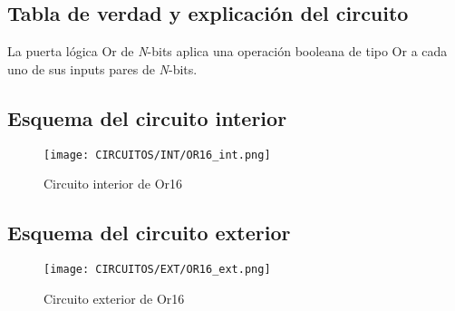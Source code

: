 \documentclass[12pt]{article}
\begin{document}
		\subsection{Tabla de verdad y explicación del circuito}
		La puerta lógica Or de \textit{N}-bits aplica una operación booleana de tipo Or a cada uno de sus inputs pares de \textit{N}-bits. \cite{nisan_nand2tetris_2005}
		\begin{table}[H]
			\centering
			\caption{Tabla de verdad de OR16}
			\label{tab:tab_or16}
		\end{table}

		\subsection{Esquema del circuito interior}
		\begin{figure}[H]
			\centering
			\texttt{[image: CIRCUITOS/INT/OR16\_int.png]}
			\caption{Circuito interior de Or16 \cite{circuitverse}}
			\label{fig:or16_int}
		\end{figure}
		\subsection{Esquema del circuito exterior}
		\begin{figure}[H]
			\centering
			\texttt{[image: CIRCUITOS/EXT/OR16\_ext.png]}
			\caption{Circuito exterior de Or16 \cite{circuitverse}}
			\label{fig:or16_ext}
		\end{figure}
\end{document}
